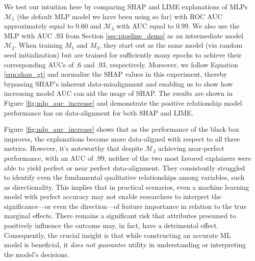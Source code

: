 \documentclass[mnsc,blindrev]{informs3}
\begin{document}
            
            We test our intuition here by comparing SHAP and LIME explanations of MLPs $\mathcal{M}_1$ (the default MLP model we have been using so far) with ROC AUC approximately equal to $0.60$ and $\mathcal{M}_3$ with AUC equal to $0.99$. We also use the MLP with AUC $.93$ from Section \ref{sec:pipeline_demo} as an intermediate model $\mathcal{M}_2$. When training $M_1$ and $M_3$, they start out as the same model (via random seed initialization) but are trained for sufficiently many epochs to achieve their corresponding AUCs of .6 and .93, respectively. Moreover, we follow Equation \ref{eqn:shap_gt} and normalize the SHAP values in this experiment, thereby bypassing SHAP's inherent data-misalignment and enabling us to show how increasing model AUC can aid the usage of SHAP. The results are shown in Figure \ref{fig:mlp_auc_increase} and demonstrate the positive relationship model performance has on data-alignment for both SHAP and LIME.
            
     Figure \ref{fig:mlp_auc_increase} shows that as the performance of the black box improves, the explanations become more data-aligned with respect to all three metrics. However, it's noteworthy that despite $\mathcal{M}_3$ achieving near-perfect performance, with an AUC of $.99$, neither of the two most favored explainers were able to yield perfect or near perfect data-alignment. They consistently struggled to identify even the fundamental qualitative relationships among variables, such as directionality. This implies that in practical scenarios, even a machine learning model with perfect accuracy may not enable researchers to interpret the significance—or even the direction—of feature importance in relation to the true marginal effects. There remains a significant risk that attributes presumed to positively influence the outcome may, in fact, have a detrimental effect. Consequently, the crucial insight is that while constructing an accurate ML model is beneficial, it \emph{does not guarantee} utility in understanding or interpreting the model's decisions. 
\end{document}
